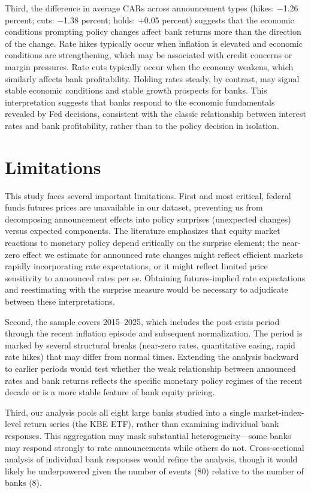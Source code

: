\documentclass{article}
\begin{document}
Third, the difference in average CARs across announcement types (hikes: −1.26 percent; cuts: −1.38 percent; holds: +0.05 percent) suggests that the economic conditions prompting policy changes affect bank returns more than the direction of the change. Rate hikes typically occur when inflation is elevated and economic conditions are strengthening, which may be associated with credit concerns or margin pressures. Rate cuts typically occur when the economy weakens, which similarly affects bank profitability. Holding rates steady, by contrast, may signal stable economic conditions and stable growth prospects for banks. This interpretation suggests that banks respond to the economic fundamentals revealed by Fed decisions, consistent with the classic relationship between interest rates and bank profitability, rather than to the policy decision in isolation.

\section{Limitations}

This study faces several important limitations. First and most critical, federal funds futures prices are unavailable in our dataset, preventing us from decomposing announcement effects into policy surprises (unexpected changes) versus expected components. The literature emphasizes that equity market reactions to monetary policy depend critically on the surprise element; the near-zero effect we estimate for announced rate changes might reflect efficient markets rapidly incorporating rate expectations, or it might reflect limited price sensitivity to announced rates per se. Obtaining futures-implied rate expectations and reestimating with the surprise measure would be necessary to adjudicate between these interpretations.

Second, the sample covers 2015--2025, which includes the post-crisis period through the recent inflation episode and subsequent normalization. The period is marked by several structural breaks (near-zero rates, quantitative easing, rapid rate hikes) that may differ from normal times. Extending the analysis backward to earlier periods would test whether the weak relationship between announced rates and bank returns reflects the specific monetary policy regimes of the recent decade or is a more stable feature of bank equity pricing.

Third, our analysis pools all eight large banks studied into a single market-index-level return series (the KBE ETF), rather than examining individual bank responses. This aggregation may mask substantial heterogeneity—some banks may respond strongly to rate announcements while others do not. Cross-sectional analysis of individual bank responses would refine the analysis, though it would likely be underpowered given the number of events (80) relative to the number of banks (8).
\end{document}
